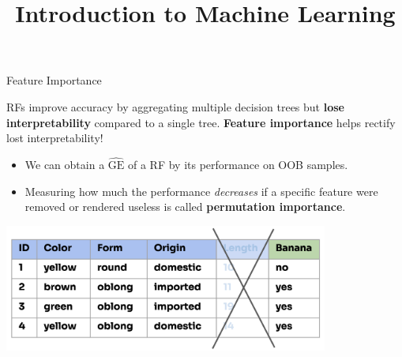 \documentclass[11pt,compress,t,notes=noshow, xcolor=table]{beamer}
\title{Introduction to Machine Learning}
\begin{document}

\begin{vbframe}{Feature Importance}

RFs improve accuracy by aggregating multiple decision trees but \textbf{lose interpretability} compared to a single tree. \textbf{Feature importance} helps rectify lost interpretability!
\\
\begin{itemize}
  \item We can obtain a $\widehat{\mathrm{GE}}$ of a RF by its performance on OOB samples.
  \item Measuring how much the performance \textit{decreases} if a specific feature were removed or rendered useless is called \textbf{permutation importance}.
\end{itemize}

\vspace{-1ex}
\begin{center}
\includegraphics[width=0.8\textwidth]{figure_man/forest-fimp_idea.png}
\end{center}

\end{vbframe}
\end{document}
